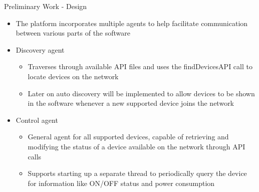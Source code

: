\documentclass{beamer}
\begin{document}
\begin{frame}{Preliminary Work - Design}{}
    \begin{itemize}
        \item The platform incorporates multiple agents to help facilitate communication between various parts of the software
        \item Discovery agent
        \begin{itemize}
            \item Traverses through available API files and uses the findDevicesAPI call to locate devices on the network
            \item Later on auto discovery will be implemented to allow devices to be shown in the software whenever a new supported device joins the network
        \end{itemize}
        \item Control agent
        \begin{itemize}
            \item General agent for all supported devices, capable of retrieving and modifying the status of a device available on the network through API calls
            \item Supports starting up a separate thread to periodically query the device for information like ON/OFF status and power consumption 
        \end{itemize}
    \end{itemize}
\end{frame}
\end{document}
